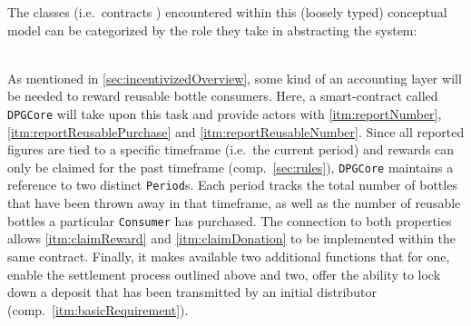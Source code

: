 The classes (i.e.~contracts \cite[p.~75]{solidityDocs}) encountered within this (loosely typed) conceptual model can be categorized by the role they take in abstracting the system:

\begin{description}[format={\storedescriptionlabel}]
	\item[Accounting\label{itm:accounting}]
	\hfill \\
	As mentioned in \autoref{sec:incentivizedOverview}, some kind of an accounting layer will be needed to reward reusable bottle consumers. Here, a smart-contract called \texttt{DPGCore} will take upon this task and provide actors with \ref{itm:reportNumber}, \ref{itm:reportReusablePurchase} and \ref{itm:reportReusableNumber}. Since all reported figures are tied to a specific timeframe (i.e.~the current period) and rewards can only be claimed for the past timeframe (comp.~\ref{sec:rules}), \texttt{DPGCore} maintains a reference to two distinct \texttt{Period}s. Each period tracks the total number of bottles that have been thrown away in that timeframe, as well as the number of reusable bottles a particular \texttt{Consumer} has purchased. The connection to both properties allows \ref{itm:claimReward} and \ref{itm:claimDonation} to be implemented within the same contract. Finally, it makes available two additional functions that for one, enable the settlement process outlined above and two, offer the ability to lock down a deposit that has been transmitted by an initial distributor (comp.~\ref{itm:basicRequirement}). 
	

\end{description}
